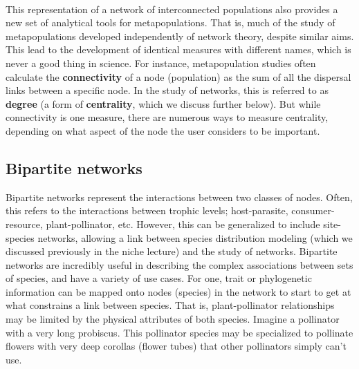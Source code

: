 \documentclass[12pt]{article}
\begin{document}
\paragraph*{}

This representation of a network of interconnected populations also provides a new set of analytical tools for metapopulations. That is, much of the study of metapopulations developed independently of network theory, despite similar aims. This lead to the development of identical measures with different names, which is never a good thing in science. For instance, metapopulation studies often calculate the \textbf{connectivity} of a node (population) as the sum of all the dispersal links between a specific node. In the study of networks, this is referred to as \textbf{degree} (a form of \textbf{centrality}, which we discuss further below). But while connectivity is one measure, there are numerous ways to measure centrality, depending on what aspect of the node the user considers to be important. 














\bigskip

\subsection*{Bipartite networks}

Bipartite networks represent the interactions between two classes of nodes. Often, this refers to the interactions between trophic levels; host-parasite, consumer-resource, plant-pollinator, etc. However, this can be generalized to include site-species networks, allowing a link between species distribution modeling (which we discussed previously in the niche lecture) and the study of networks. Bipartite networks are incredibly useful in describing the complex associations between sets of species, and have a variety of use cases. For one, trait or phylogenetic information can be mapped onto nodes (species) in the network to start to get at what constrains a link between species. That is, plant-pollinator relationships may be limited by the physical attributes of both species. Imagine a pollinator with a very long probiscus. This pollinator species may be specialized to pollinate flowers with very deep corollas (flower tubes) that other pollinators simply can't use. 
\end{document}

